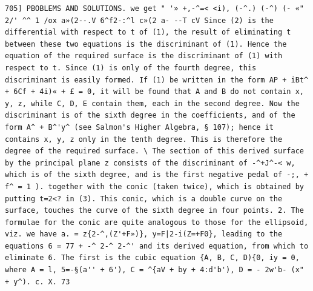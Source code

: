 \documentclass[12pt]{article}
\theoremstyle{plain}
\begin{document}
\newpage
\setcounter{page}{577}
\begin{verbatim}
705] PBOBLEMS AND SOLUTIONS. we get " '» +,-^=< <i), (-^.) (-^) (- «" 2/' ^^ 1 /ox a»(2--.V 6^f2-:^l c»(2 a- --T cV Since (2) is the differential with respect to t of (1), the result of eliminating t between these two equations is the discriminant of (1). Hence the equation of the required surface is the discriminant of (1) with respect to t. Since (1) is only of the fourth degree, this discriminant is easily formed. If (1) be written in the form AP + iBt^ + 6Cf + 4i)« + £ = 0, it will be found that A and B do not contain x, y, z, while C, D, E contain them, each in the second degree. Now the discriminant is of the sixth degree in the coefficients, and of the form A^ + B^'y^ (see Salmon's Higher Algebra, § 107); hence it contains x, y, z only in the tenth degree. This is therefore the degree of the required surface. \ The section of this derived surface by the principal plane z consists of the discriminant of -^+J^-< w, which is of the sixth degree, and is the first negative pedal of -;, + f^ = 1 ). together with the conic (taken twice), which is obtained by putting t=2<? in (3). This conic, which is a double curve on the surface, touches the curve of the sixth degree in four points. 2. The formulae for the conic are quite analogous to those for the ellipsoid, viz. we have a. = z{2-^,(Z'+F»)}, y=F|2-i(Z=+F0}, leading to the equations 6 = 77 + -^ 2-^ 2-^' and its derived equation, from which to eliminate 6. The first is the cubic equation {A, B, C, D){0, iy = 0, where A = l, 5=-§(a'' + 6'), C = ^{aV + by + 4:d'b'), D = - 2w'b- (x" + y^). c. X. 73 
\end{verbatim}
\end{document}

